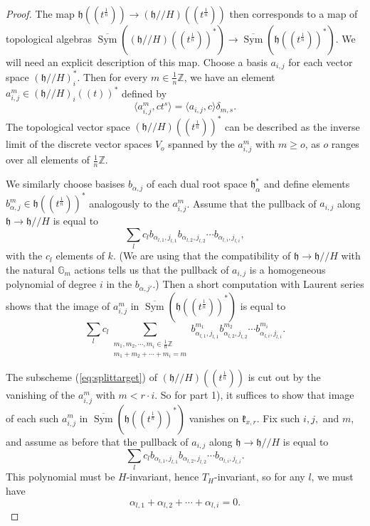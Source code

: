 \documentclass[12pt]{article}
\DeclareMathOperator{\Sym}{Sym}
\theoremstyle{remark}
\begin{document}
\begin{proof}
The map $\mathfrak{h}((t^{\frac{1}{n}}))\rightarrow(\mathfrak{h}//H)((t^{\frac{1}{n}}))$ then corresponds to a map of topological algebras $\overline{\Sym}((\mathfrak{h}//H)((t^{\frac{1}{n}}))^*)\rightarrow\overline{\Sym}(\mathfrak{h}((t^{\frac{1}{n}}))^*)$. We will need an explicit description of this map. Choose a basis $a_{i,j}$ for each vector space $(\mathfrak{h}//H)_i^*$. Then for every $m\in\frac{1}{n}\mathbb{Z}$, we have an element $a_{i,j}^m\in(\mathfrak{h}//H)_i((t))^*$ defined by
\[
\langle a_{i,j}^m,ct^s\rangle=\langle a_{i,j},c\rangle\delta_{m,s}.
\]
The topological vector space $(\mathfrak{h}//H)((t^{\frac{1}{n}}))^*$ can be described as the inverse limit of the discrete vector spaces $V_o$ spanned by the $a_{i,j}^m$ with $m\geq o$, as $o$ ranges over all elements of $\frac{1}{n}\mathbb{Z}.$

We similarly choose basises $b_{\alpha,j}$ of each dual root space $\mathfrak{h}_{\alpha}^*$ and define elements $b_{\alpha,j}^m\in\mathfrak{h}((t^{\frac{1}{n}}))^*$ analogously to the $a_{i,j}^m$. Assume that the pullback of $a_{i,j}$ along $\mathfrak{h}\rightarrow\mathfrak{h}//H$ is equal to
\[
\displaystyle\sum_{l}c_{l}b_{\alpha_{l,1},j_{l,1}}b_{\alpha_{l,2},j_{l,2}}\cdots b_{\alpha_{l,i},j_{l,i}},
\]
with the $c_{l}$ elements of $k$. (We are using that the compatibility of $\mathfrak{h}\rightarrow\mathfrak{h}//H$ with the natural $\mathbb{G}_m$ actions tells us that the pullback of $a_{i,j}$ is a homogeneous polynomial of degree $i$ in the $b_{\alpha,j'}$.) Then a short computation with Laurent series shows that the image of $a_{i,j}^m$ in $\overline{\Sym}(\mathfrak{h}((t^{\frac{1}{n}}))^*)$ is equal to
\[
\displaystyle\sum_{l}c_l\sum_{\substack{m_1,m_2,\cdots, m_i\in\frac{1}{n}\mathbb{Z}\\ m_1+m_2+\cdots+m_i=m}}b_{\alpha_{l,1},j_{l,1}}^{m_1}b_{\alpha_{l,2},j_{l,2}}^{m_2}\cdots b_{\alpha_{l,i},j_{l,i}}^{m_i}.
\]

The subscheme (\ref{eq:splittarget}) of $(\mathfrak{h}//H)((t^{\frac{1}{n}}))$ is cut out by the vanishing of the $a_{i,j}^m$ with $m<r\cdot i$. So for part 1), it suffices to show that image of each such $a_{i,j}^m$ in $\overline{\Sym}(\mathfrak{h}((t^{\frac{1}{n}}))^*)$ vanishes on $\mathfrak{k}_{x,r}$. Fix such $i,j,$ and $m$, and assume as before that the pullback of $a_{i,j}$ along $\mathfrak{h}\rightarrow\mathfrak{h}//H$ is equal to
\[
\displaystyle\sum_{l}c_{l}b_{\alpha_{l,1},j_{l,1}}b_{\alpha_{l,2},j_{l,2}}\cdots b_{\alpha_{l,i},j_{l,i}}.
\]
This polynomial must be $H$-invariant, hence $T_H$-invariant, so for any $l$, we must have
\[
\alpha_{l,1}+\alpha_{l,2}+\cdots+\alpha_{l,i}=0.
\]


\end{proof}
\end{document}
